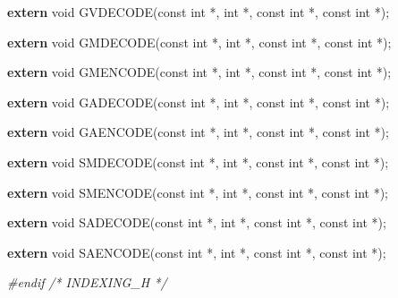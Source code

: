 \documentclass[
  12pt,
]{article}
\newenvironment{Shaded}{\begin{snugshade}}{\end{snugshade}}
\newcommand{\CommentTok}[1]{\textcolor[rgb]{0.56,0.35,0.01}{\textit{#1}}}
\newcommand{\DataTypeTok}[1]{\textcolor[rgb]{0.13,0.29,0.53}{#1}}
\newcommand{\KeywordTok}[1]{\textcolor[rgb]{0.13,0.29,0.53}{\textbf{#1}}}
\newcommand{\NormalTok}[1]{#1}
\newcommand{\PreprocessorTok}[1]{\textcolor[rgb]{0.56,0.35,0.01}{\textit{#1}}}
\begin{document}
\begin{Shaded}
\begin{Highlighting}[]
\KeywordTok{extern} \DataTypeTok{void}\NormalTok{ GVDECODE(}\DataTypeTok{const} \DataTypeTok{int}\NormalTok{ *, }\DataTypeTok{int}\NormalTok{ *, }\DataTypeTok{const} \DataTypeTok{int}\NormalTok{ *, }\DataTypeTok{const} \DataTypeTok{int}\NormalTok{ *);}

\KeywordTok{extern} \DataTypeTok{void}\NormalTok{ GMDECODE(}\DataTypeTok{const} \DataTypeTok{int}\NormalTok{ *, }\DataTypeTok{int}\NormalTok{ *, }\DataTypeTok{const} \DataTypeTok{int}\NormalTok{ *, }\DataTypeTok{const} \DataTypeTok{int}\NormalTok{ *);}

\KeywordTok{extern} \DataTypeTok{void}\NormalTok{ GMENCODE(}\DataTypeTok{const} \DataTypeTok{int}\NormalTok{ *, }\DataTypeTok{int}\NormalTok{ *, }\DataTypeTok{const} \DataTypeTok{int}\NormalTok{ *, }\DataTypeTok{const} \DataTypeTok{int}\NormalTok{ *);}

\KeywordTok{extern} \DataTypeTok{void}\NormalTok{ GADECODE(}\DataTypeTok{const} \DataTypeTok{int}\NormalTok{ *, }\DataTypeTok{int}\NormalTok{ *, }\DataTypeTok{const} \DataTypeTok{int}\NormalTok{ *, }\DataTypeTok{const} \DataTypeTok{int}\NormalTok{ *);}

\KeywordTok{extern} \DataTypeTok{void}\NormalTok{ GAENCODE(}\DataTypeTok{const} \DataTypeTok{int}\NormalTok{ *, }\DataTypeTok{int}\NormalTok{ *, }\DataTypeTok{const} \DataTypeTok{int}\NormalTok{ *, }\DataTypeTok{const} \DataTypeTok{int}\NormalTok{ *);}

\KeywordTok{extern} \DataTypeTok{void}\NormalTok{ SMDECODE(}\DataTypeTok{const} \DataTypeTok{int}\NormalTok{ *, }\DataTypeTok{int}\NormalTok{ *, }\DataTypeTok{const} \DataTypeTok{int}\NormalTok{ *, }\DataTypeTok{const} \DataTypeTok{int}\NormalTok{ *);}

\KeywordTok{extern} \DataTypeTok{void}\NormalTok{ SMENCODE(}\DataTypeTok{const} \DataTypeTok{int}\NormalTok{ *, }\DataTypeTok{int}\NormalTok{ *, }\DataTypeTok{const} \DataTypeTok{int}\NormalTok{ *, }\DataTypeTok{const} \DataTypeTok{int}\NormalTok{ *);}

\KeywordTok{extern} \DataTypeTok{void}\NormalTok{ SADECODE(}\DataTypeTok{const} \DataTypeTok{int}\NormalTok{ *, }\DataTypeTok{int}\NormalTok{ *, }\DataTypeTok{const} \DataTypeTok{int}\NormalTok{ *, }\DataTypeTok{const} \DataTypeTok{int}\NormalTok{ *);}

\KeywordTok{extern} \DataTypeTok{void}\NormalTok{ SAENCODE(}\DataTypeTok{const} \DataTypeTok{int}\NormalTok{ *, }\DataTypeTok{int}\NormalTok{ *, }\DataTypeTok{const} \DataTypeTok{int}\NormalTok{ *, }\DataTypeTok{const} \DataTypeTok{int}\NormalTok{ *);}

\PreprocessorTok{\#endif }\CommentTok{/* INDEXING\_H */}
\end{Highlighting}
\end{Shaded}
\end{document}
